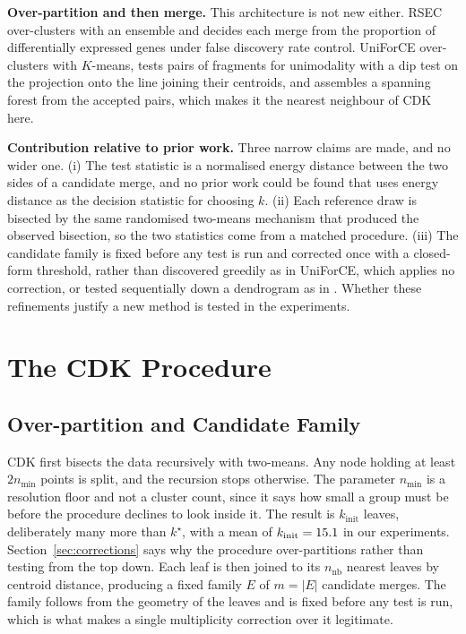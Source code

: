 \documentclass[runningheads]{llncs}
\begin{document}
\medskip\noindent\textbf{Over-partition and then merge.} This architecture is
not new either. RSEC \cite{risso2018rsec} over-clusters with an ensemble and
decides each merge from the proportion of differentially expressed genes under
false discovery rate control. UniForCE \cite{vardakas2026uniforce}
over-clusters with $K$-means, tests pairs of fragments for unimodality with a
dip test on the projection onto the line joining their centroids, and
assembles a spanning forest from the accepted pairs, which makes it the
nearest neighbour of CDK here.

\medskip\noindent\textbf{Contribution relative to prior work.} Three narrow
claims are made, and no wider one. (i) The test statistic is a normalised energy distance
\cite{szekely2013energy} between the two sides of a candidate merge, and no
prior work could be found that uses energy distance as the decision statistic
for choosing $k$. (ii) Each reference draw is bisected by the same randomised
two-means mechanism that produced the observed bisection, so the two
statistics come from a matched procedure. (iii) The candidate family is fixed
before any test is run and corrected once with a closed-form threshold, rather
than discovered greedily as in UniForCE, which applies no correction, or
tested sequentially down a dendrogram as in \cite{kimes2017shc}. Whether these
refinements justify a new method is tested in the experiments.

\section{The CDK Procedure}
\label{sec:method}

\subsection{Over-partition and Candidate Family}

CDK first bisects the data recursively with two-means. Any node holding at
least $2n_{\min}$ points is split, and the recursion stops otherwise. The
parameter $n_{\min}$ is a resolution floor and not a cluster count, since it
says how small a group must be before the procedure declines to look inside
it. The result is $k_{\text{init}}$ leaves, deliberately many more than
$k^\star$, with a mean of $k_{\text{init}} = 15.1{}$ in our experiments.
Section~\ref{sec:corrections} says why the procedure over-partitions rather
than testing from the top down. Each leaf is then joined to its
$n_{\text{nb}}$ nearest leaves by centroid distance, producing a fixed family
$E$ of $m = |E|$ candidate merges. The family follows from the geometry of the
leaves and is fixed before any test is run, which is what makes a single
multiplicity correction over it legitimate.
\end{document}
